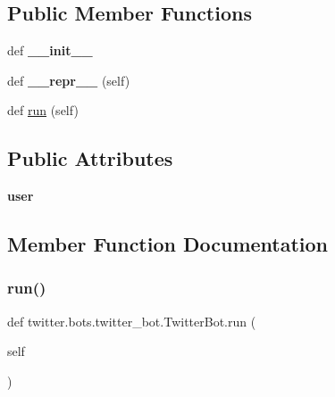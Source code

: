 \subsection*{Public Member Functions}
\begin{DoxyCompactItemize}
\item 
\mbox{\label{classtwitter_1_1bots_1_1twitter__bot_1_1TwitterBot_a19e4ba96300342dd63980717852a30b3}} 
def {\bfseries \+\_\+\+\_\+init\+\_\+\+\_\+}
\item 
\mbox{\label{classtwitter_1_1bots_1_1twitter__bot_1_1TwitterBot_a599499bf98dd54aeb95938c18086477f}} 
def {\bfseries \+\_\+\+\_\+repr\+\_\+\+\_\+} (self)
\item 
def \hyperlink{classtwitter_1_1bots_1_1twitter__bot_1_1TwitterBot_aa0425e1810fa53dab90ca0e9d7b973d1}{run} (self)
\end{DoxyCompactItemize}
\subsection*{Public Attributes}
\begin{DoxyCompactItemize}
\item 
\mbox{\label{classtwitter_1_1bots_1_1twitter__bot_1_1TwitterBot_af7ed1ab8062dc7e29dbf8ced90b6ca3c}} 
{\bfseries user}
\end{DoxyCompactItemize}


\subsection{Member Function Documentation}
\mbox{\label{classtwitter_1_1bots_1_1twitter__bot_1_1TwitterBot_aa0425e1810fa53dab90ca0e9d7b973d1}} 
\subsubsection{\texorpdfstring{run()}{run()}}
{\footnotesize\ttfamily def twitter.\+bots.\+twitter\+\_\+bot.\+Twitter\+Bot.\+run (\begin{DoxyParamCaption}\item[{}]{self }\end{DoxyParamCaption})}

